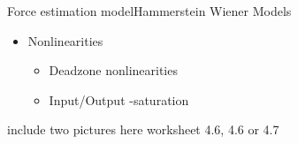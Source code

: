 


\begin{frame}{Force estimation model}{Hammerstein Wiener Models}
\begin{itemize}
  \item Nonlinearities
  \begin{itemize}
    \item Deadzone nonlinearities
    \item Input/Output -saturation 
  \end{itemize}
\end{itemize}
\end{frame}



include two pictures here worksheet 4.6, 4.6 or 4.7

















